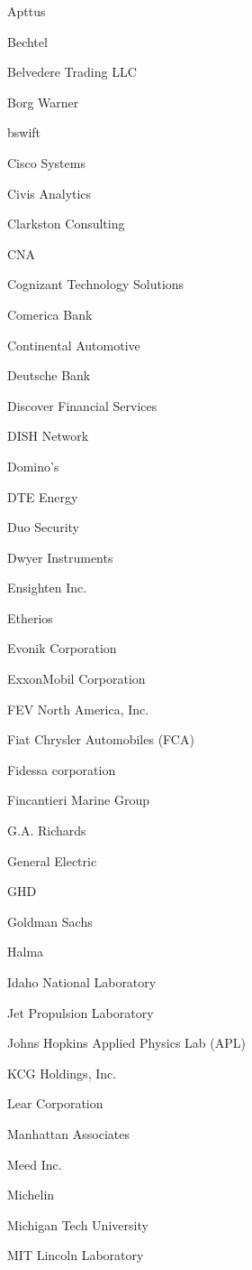 \documentclass[twoside]{article}
\begin{document}
\begin{center}
\begin{multicols}{5}
\begin{FlushLeft}
\begin{compactitem}
\item Apttus
\item Bechtel
\item Belvedere Trading LLC
\item Borg Warner
\item bswift
\item Cisco Systems
\item Civis Analytics
\item Clarkston Consulting
\item CNA
\item Cognizant Technology Solutions
\item Comerica Bank
\item Continental Automotive
\item Deutsche Bank
\item Discover Financial Services
\item DISH Network
\item Domino's
\item DTE Energy
\item Duo Security
\item Dwyer Instruments
\item Ensighten Inc.
\item Etherios
\item Evonik Corporation
\item ExxonMobil Corporation
\item FEV North America, Inc.
\item Fiat Chrysler Automobiles (FCA)
\item Fidessa corporation
\item Fincantieri Marine Group
\item G.A. Richards
\item General Electric
\item GHD
\item Goldman Sachs
\item Halma
\item Idaho National Laboratory
\item Jet Propulsion Laboratory
\item Johns Hopkins Applied Physics Lab (APL)
\item KCG Holdings, Inc.
\item Lear Corporation
\item Manhattan Associates
\item Meed Inc.
\item Michelin
\item Michigan Tech University
\item MIT Lincoln Laboratory

\end{compactitem}
\end{FlushLeft}
\end{multicols}
\end{center}
\end{document}
